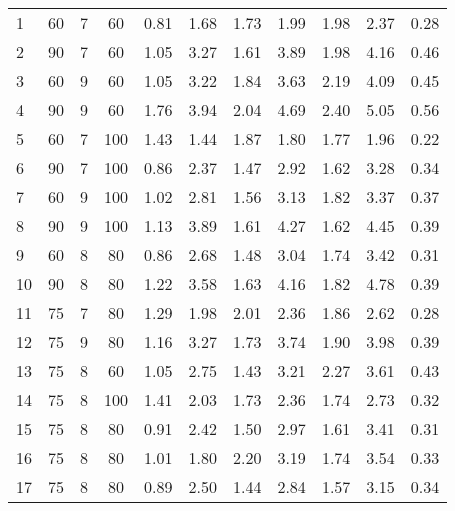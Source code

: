 \begin{landscape}
\begin{table}[h]
\begin{center}
\begin{tabular}{l c c c c c c c c c c}
{1}&{60}	&{7}	&{60}	&{0.81}	&{1.68}	&{1.73}	&{1.99}	&{1.98}	&{2.37}	&{0.28}\\
{2}&{90}	&{7}	&{60}	&{1.05}	&{3.27}	&{1.61}	&{3.89}	&{1.98}	&{4.16}	&{0.46}\\
{3}&{60}	&{9}	&{60}	&{1.05}	&{3.22}	&{1.84}	&{3.63}	&{2.19}	&{4.09}	&{0.45}\\
{4}&{90}	&{9}	&{60}	&{1.76}	&{3.94}	&{2.04}	&{4.69} & 
{2.40}	&{5.05}	&{0.56}\\
{5}&{60}	&{7}	&{100}	&{1.43}	&{1.44}	&{1.87}	&{1.80}	&{1.77}	&{1.96}	&{0.22}\\
{6}&{90}	&{7}	&{100}	&{0.86}	&{2.37}	&{1.47}	&{2.92} &	{1.62}	&{3.28}	&{0.34}\\
{7}&{60}	&{9}	&{100}	&{1.02}	&{2.81}	&{1.56}	&{3.13} &	{1.82}	&{3.37}	&{0.37}\\
{8}&{90}	&{9}	&{100}	&{1.13}	&{3.89}	&{1.61}	&{4.27} &	{1.62} 	&{4.45}	&{0.39}\\
{9}&{60}&	{8}	&{80}	&{0.86}	&{2.68}	&{1.48}	&{3.04} &	{1.74}&	{3.42}	&{0.31}\\
{10}&{90}	&{8}	&{80}	&{1.22}	&{3.58}	&{1.63}	&{4.16} &	{1.82} &{4.78}	&{0.39}\\
{11}&{75}	&{7}	&{80}	&{1.29}	&{1.98}	&{2.01}	&{2.36} &	{1.86}	&{2.62}	&{0.28}\\
{12}&{75}	&{9}	&{80}	&{1.16}	&{3.27}	&{1.73}	&{3.74} &
{1.90}	&{3.98}	&{0.39}\\
{13}&{75}&	{8}	&{60}	&{1.05}	&{2.75}	&{1.43}	&{3.21} &	{2.27}	&{3.61}	&{0.43}\\
{14}&{75}	&{8}	&{100}	&{1.41}	&{2.03}	&{1.73}	&{2.36} &	{1.74}	&{2.73}	&{0.32}\\
{15}&{75}	&{8}	&{80}	&{0.91}	&{2.42}	&{1.50}	&{2.97} &	{1.61}	&{3.41}	&{0.31}\\
{16}&{75}&	{8}	&{80}	&{1.01}	&{1.80}	&{2.20}	&{3.19} &	{1.74} &	{3.54}	&{0.33}\\
{17}&{75}	&{8}	&{80}	&{0.89}	&{2.50}	&{1.44}	&{2.84} &	{1.57}	&{3.15}	&{0.34}\\\hline
\end{tabular}
\end{center}
\end{table}
\pagebreak
\newpage
\clearpage

 \\ \\



\end{landscape}
